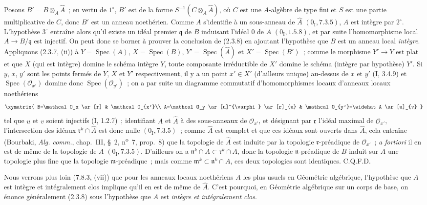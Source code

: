 Posons $B'=B\otimes_A\widehat A$~; en vertu de $1^\circ$, $B'$ est de la forme
$S^{-1}(C\otimes_A\widehat A)$, où $C$ est une $A$-algèbre de type fini et
$S$ est une partie multiplicative de $C$, donc $B'$ est un anneau noethérien.
Comme $A$ s'identifie à un sous-anneau de $\widehat A$
$(0_{\mathrm I},7.3.5)$, $A$ est intègre par $2^\circ$. L'hypothèse
$3^\circ$ entraîne alors qu'il existe un idéal premier $\mathfrak q$ de $B$
induisant l'idéal 0 de $A$ $(0_{\mathrm I},1.5.8)$, et par suite
l'homomorphisme local $A\to B/\mathfrak q$ est injectif. On peut donc se borner
à prouver la conclusion de (2.3.8) en ajoutant l'hypothèse que $B$ est un
anneau local \emph{intègre}. Appliquons (2.3.7, (ii)) à
$Y=\operatorname{Spec}(A)$, $X=\operatorname{Spec}(B)$,
$Y'=\operatorname{Spec}(\widehat A)$ et $X'=\operatorname{Spec}(B')$~; comme
le morphisme $Y'\to Y$ est plat et que $X$ (qui est intègre) domine le schéma
intègre $Y$, toute composante irréductible de $X'$ domine le schéma (intègre
par hypothèse) $Y'$. Si $y$, $x$, $y'$ sont les points fermés de $Y$, $X$ et
$Y'$ respectivement, il y a un point $x'\in X'$ (d'ailleurs unique) au-dessus
de $x$ et $y'$ (I, 3.4.9) et $\operatorname{Spec}(\mathcal O_{x'})$ domine
donc $\operatorname{Spec}(\mathcal O_{y'})$~; on a par suite un diagramme
commutatif d'homomorphismes locaux d'anneaux locaux noethériens
\[
\xymatrix{
  B=\mathcal O_x \ar[r] & \mathcal O_{x'}\\
  A=\mathcal O_y \ar[u]^{\varphi} \ar[r]_{u} &
  \mathcal O_{y'}=\widehat A \ar[u]_{v}
}
\]
tel que $u$ et $v$ soient injectifs (I, 1.2.7)~; identifiant $A$ et
$\widehat A$ à des sous-anneaux de $\mathcal O_{x'}$, et désignant par
$\mathfrak r$ l'idéal maximal de $\mathcal O_{x'}$, l'intersection des idéaux
$\mathfrak r^k\cap\widehat A$ est donc nulle $(0_{\mathrm I},7.3.5)$~;
comme $\widehat A$ est complet et que ces idéaux sont ouverts dans
$\widehat A$, cela entraîne (Bourbaki, \emph{Alg. comm.}, chap.~III, \S~2,
n\textsuperscript{o}~7, prop.~8) que la topologie de $\widehat A$ est induite
par la topologie $\mathfrak r$-préadique de $\mathcal O_{x'}$~; \emph{a
fortiori} il en est de même de la topologie de $A$
$(0_{\mathrm I},7.3.5)$. D'ailleurs on a
$\mathfrak n^k\cap A\subset\mathfrak r^k\cap A$, donc la topologie
$\mathfrak n$-préadique de $B$ induit sur $A$ une topologie plus fine que la
topologie $\mathfrak m$-préadique~; mais comme
$\mathfrak m^k\subset\mathfrak n^k\cap A$, ces deux topologies sont
identiques. C.Q.F.D.

\begin{remark}[2.3.9]
\label{IV.2.3.9-fr}
Nous verrons plus loin (7.8.3, (vii)) que pour les anneaux locaux noethériens
$A$ les plus usuels en Géométrie algébrique, l'hypothèse que $A$ est intègre
et intégralement clos implique qu'il en est de même de $\widehat A$. C'est
pourquoi, en Géométrie algébrique sur un corps de base, on énonce généralement
(2.3.8) sous l'hypothèse que $A$ est \emph{intègre et intégralement clos}.
\end{remark}

